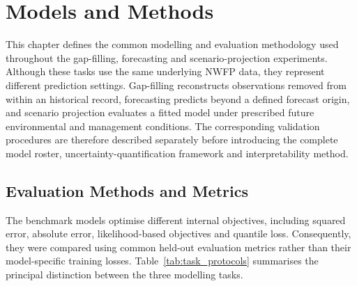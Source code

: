 \chapter{Models and Methods}
\label{ChapModels}

This chapter defines the common modelling and evaluation methodology used
throughout the gap-filling, forecasting and scenario-projection experiments.
Although these tasks use the same underlying NWFP data, they represent
different prediction settings. Gap-filling reconstructs observations removed
from within an historical record, forecasting predicts beyond a defined
forecast origin, and scenario projection evaluates a fitted model under
prescribed future environmental and management conditions. The corresponding
validation procedures are therefore described separately before introducing
the complete model roster, uncertainty-quantification framework and
interpretability method.


\section{Evaluation Methods and Metrics}
\label{sec:evaluation_protocols}

The benchmark models optimise different internal objectives, including squared
error, absolute error, likelihood-based objectives and quantile loss.
Consequently, they were compared using common held-out evaluation metrics
rather than their model-specific training losses. Table~\ref{tab:task_protocols}
summarises the principal distinction between the three modelling tasks.

